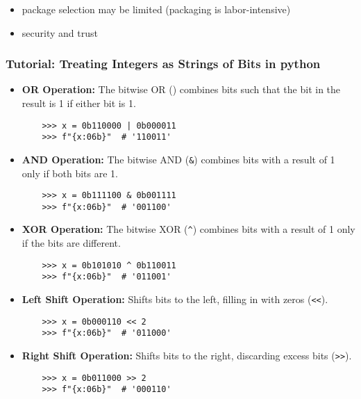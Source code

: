\documentclass[12pt]{article}
\begin{document}
\begin{itemize}
  \item package selection may be limited (packaging is labor-intensive)
  \item security and trust
\end{itemize}


\subsubsection{Tutorial: Treating Integers as Strings of Bits in python}
\begin{itemize}
    \item \textbf{OR Operation:} The bitwise OR (\texttt{\textbar}) combines bits such that the bit in the result is 1 if either bit is 1.
    \begin{lstlisting}
    >>> x = 0b110000 | 0b000011
    >>> f"{x:06b}"  # '110011'
    \end{lstlisting}

    \item \textbf{AND Operation:} The bitwise AND (\texttt{\&}) combines bits with a result of 1 only if both bits are 1.
    \begin{lstlisting}
    >>> x = 0b111100 & 0b001111
    >>> f"{x:06b}"  # '001100'
    \end{lstlisting}

    \item \textbf{XOR Operation:} The bitwise XOR (\texttt{\textasciicircum}) combines bits with a result of 1 only if the bits are different.
    \begin{lstlisting}
    >>> x = 0b101010 ^ 0b110011
    >>> f"{x:06b}"  # '011001'
    \end{lstlisting}

    \item \textbf{Left Shift Operation:} Shifts bits to the left, filling in with zeros (\texttt{<<}).
    \begin{lstlisting}
    >>> x = 0b000110 << 2
    >>> f"{x:06b}"  # '011000'
    \end{lstlisting}

    \item \textbf{Right Shift Operation:} Shifts bits to the right, discarding excess bits (\texttt{>>}).
    \begin{lstlisting}
    >>> x = 0b011000 >> 2
    >>> f"{x:06b}"  # '000110'
    \end{lstlisting}
\end{itemize}
\end{document}

